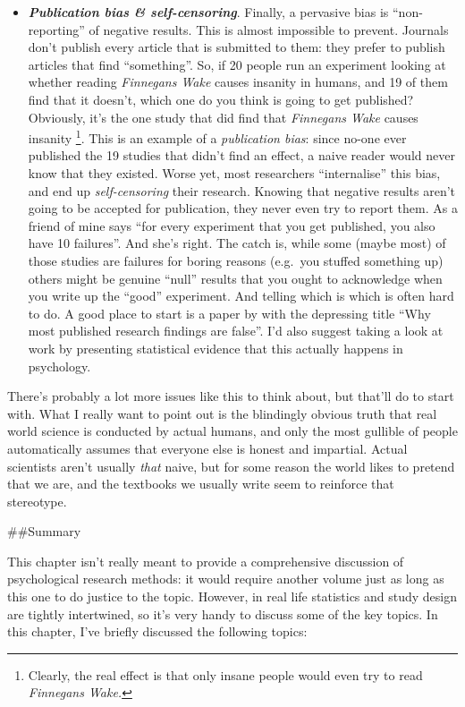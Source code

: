 \documentclass[]{book}
\begin{document}
\begin{itemize}
\item
  \textbf{\emph{Publication bias \& self-censoring}}. Finally, a pervasive bias is ``non-reporting'' of negative results. This is almost impossible to prevent. Journals don't publish every article that is submitted to them: they prefer to publish articles that find ``something''. So, if 20 people run an experiment looking at whether reading \emph{Finnegans Wake} causes insanity in humans, and 19 of them find that it doesn't, which one do you think is going to get published? Obviously, it's the one study that did find that \emph{Finnegans Wake} causes insanity \footnote{Clearly, the real effect is that only insane people would even try to read \emph{Finnegans Wake.}}. This is an example of a \emph{publication bias}: since no-one ever published the 19 studies that didn't find an effect, a naive reader would never know that they existed. Worse yet, most researchers ``internalise'' this bias, and end up \emph{self-censoring} their research. Knowing that negative results aren't going to be accepted for publication, they never even try to report them. As a friend of mine says ``for every experiment that you get published, you also have 10 failures''. And she's right. The catch is, while some (maybe most) of those studies are failures for boring reasons (e.g.~you stuffed something up) others might be genuine ``null'' results that you ought to acknowledge when you write up the ``good'' experiment. And telling which is which is often hard to do. A good place to start is a paper by \citet{Ioannidis2005} with the depressing title ``Why most published research findings are false''. I'd also suggest taking a look at work by \citet{Kuhberger2014} presenting statistical evidence that this actually happens in psychology.
\end{itemize}

There's probably a lot more issues like this to think about, but that'll do to start with. What I really want to point out is the blindingly obvious truth that real world science is conducted by actual humans, and only the most gullible of people automatically assumes that everyone else is honest and impartial. Actual scientists aren't usually \emph{that} naive, but for some reason the world likes to pretend that we are, and the textbooks we usually write seem to reinforce that stereotype.

\#\#Summary

This chapter isn't really meant to provide a comprehensive discussion of psychological research methods: it would require another volume just as long as this one to do justice to the topic. However, in real life statistics and study design are tightly intertwined, so it's very handy to discuss some of the key topics. In this chapter, I've briefly discussed the following topics:
\end{document}
